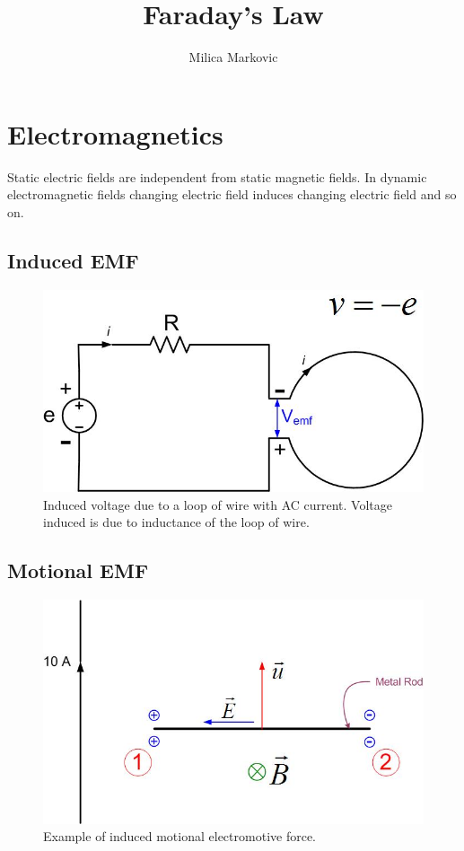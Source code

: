 \documentclass{ximera}
\title{Faraday's Law}
\author{Milica Markovic}
\begin{document}
  
\begin{abstract}  

\end{abstract}  
\maketitle    


\section{Electromagnetics}

 Static electric fields are independent from static magnetic fields. In dynamic electromagnetic fields changing electric field induces changing electric field and so on. 



\subsection{Induced EMF}




\begin{figure}[htbp]
\begin{center}
\includegraphics[scale=0.5]{../jpg/inducedvoltage.jpg}
\end{center}
\caption{Induced voltage due to a loop of wire with AC current. Voltage induced is due to inductance of the loop of wire.}
\label{inducedemf}
\end{figure}




\subsection{Motional EMF}


\begin{figure}[htbp]
\begin{center}
\includegraphics[scale=0.5]{../jpg/motionalemf.jpg}
\end{center}
\caption{Example of induced motional electromotive force.}
\label{inducedemf}
\end{figure}
\end{document}
